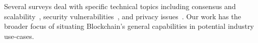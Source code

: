 Several surveys deal with specific technical topics including consensus and scalability~\cite{Gervais16,Croman16,Bano17,garay2018consensus}, security vulnerabilities~\cite{Conti17}, and privacy issues~\cite{Henry18}. Our work has the broader focus of situating Blockchain's general capabilities in potential industry use-cases. 




